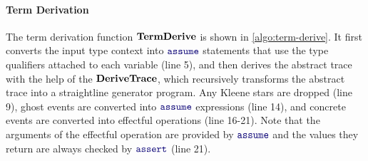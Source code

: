 \begin{algorithm}[t!]
    \caption{Term Derivation}
    \label{algo:term-derive}
  \end{algorithm}

  \paragraph{Term Derivation} The term derivation function
  \(\S{TermDerive}\) is shown in \autoref{algo:term-derive}. It first
  converts the input type context into \(\mykw{assume}\) statements
  that use the type qualifiers attached to each variable (line 5), and
  then derives the abstract trace with the help of the
  \(\S{DeriveTrace}\), which recursively transforms the abstract trace
  into a straightline generator program.  Any Kleene stars are dropped
  (line 9), ghost events are converted into \(\mykw{assume}\)
  expressions (line 14), and concrete events are converted into
  effectful operations (line 16-21).  Note that the arguments of the
  effectful operation are provided by $\mykw{assume}$ and the values
  they return are always checked by $\mykw{assert}$ (line 21).

